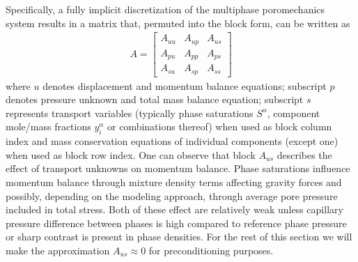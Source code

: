 Specifically, a fully implicit discretization of the multiphase poromechanics system  results in a matrix that, permuted into the block form, can be written as
\begin{align}
    A = 
    \begin{bmatrix}
        A_{uu} & A_{up} & A_{us} \\
        A_{pu} & A_{pp} & A_{ps} \\
        A_{su} & A_{sp} & A_{ss}
    \end{bmatrix}
    \label{eq:multiphase_poromechanics_block_form}
\end{align}
where $u$ denotes displacement and momentum balance equations; subscript $p$ denotes pressure unknown and total mass balance equation; subscript $s$ represents transport variables (typically phase saturations $S^\alpha$, component mole/mass fractions $y_i^\alpha$ or combinations thereof) when used as block column index and mass conservation equations of individual components (except one) when used as block row index.   One can observe that block $A_{us}$ describes the effect of transport unknowns on momentum balance.   Phase saturations influence momentum balance through mixture density terms affecting gravity forces and possibly, depending on the modeling approach, through average pore pressure included in total stress.   Both of these effect are relatively weak unless capillary pressure difference between phases is high compared to reference phase pressure or sharp contrast is present in phase densities.   For the rest of this section we will make the approximation $A_{us} \approx 0$ for preconditioning purposes.

